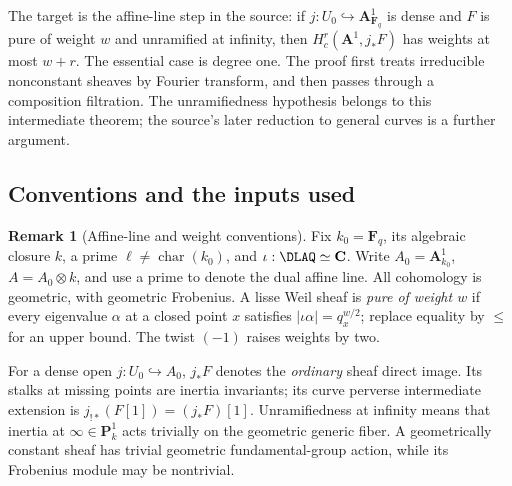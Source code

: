 \documentclass[11pt]{article}
\theoremstyle{plain}
\theoremstyle{definition}
\newtheorem{remark}[theorem]{Remark}
\begin{document}
The target is the affine-line step in the source: if $j:U_0\hookrightarrow
\mathbf A^1_{\mathbf F_q}$ is dense and $F$ is pure of weight $w$ and
unramified at infinity, then $H_c^r(\mathbf A^1,j_*F)$ has weights at most
$w+r$. The essential case is degree one. The proof first treats
irreducible nonconstant sheaves by Fourier transform, and then passes
through a composition filtration. The unramifiedness hypothesis belongs
to this intermediate theorem; the source's later reduction to general
curves is a further argument.

\subsection{Conventions and the inputs used}

\begin{remark}[Affine-line and weight conventions]
\label{d:dl-a1-setup}
Fix $k_0=\mathbf F_q$, its algebraic closure $k$, a prime $\ell\ne
\operatorname{char}(k_0)$, and $\iota:\DLAQ\simeq\mathbf C$. Write
$A_0=\mathbf A^1_{k_0}$, $A=A_0\otimes k$, and use a prime to denote the
dual affine line. All cohomology is geometric, with geometric Frobenius.
A lisse Weil sheaf is \emph{pure of weight $w$} if every eigenvalue
$\alpha$ at a closed point $x$ satisfies
$|\iota\alpha|=q_x^{w/2}$; replace equality by $\leq$ for an upper bound.
The twist $(-1)$ raises weights by two.

For a dense open $j:U_0\hookrightarrow A_0$, $j_*F$ denotes the
\emph{ordinary} sheaf direct image. Its stalks at missing points are
inertia invariants; its curve perverse intermediate extension is
$j_{!*}(F[1])=(j_*F)[1]$. Unramifiedness at infinity means that inertia
at $\infty\in\mathbf P^1_k$ acts trivially on the geometric generic fiber.
A geometrically constant sheaf has trivial geometric fundamental-group
action, while its Frobenius module may be nontrivial.
\end{remark}
\end{document}
